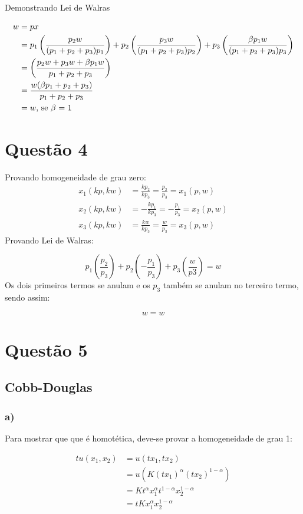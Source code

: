 \documentclass[
  letterpaper,
  DIV=11,
  numbers=noendperiod]{scrartcl}
\begin{document}
Demonstrando Lei de Walras

\begin{align}
w &= px \\
 &=  p_1 \left(\frac{p_2w}{(p_1+p_2+p_3)p_1}\right) + p_2\left(\frac{p_3w}{(p_1+p_2+p_3)p_2}\right) +
p_3 \left(\frac{\beta p_1w}{(p_1+p_2+p_3)p_3}\right) \\
&= \left(\frac{p_2w + p_3w + \beta p_1w}{p_1 + p_2 + p_3}\right) \\
&= \frac{w(\beta p_1 + p_2 +  p_3)}{p_1 + p_2 +  p_3} \\
&= w \textnormal{, se $\beta$ = 1}
\end{align}

\section{Questão 4}\label{questuxe3o-4}

Provando homogeneidade de grau zero: \begin{align}
x_1(kp, kw) &= \frac{kp_2}{kp_3} = \frac{p_2}{p_3} = x_1(p,w) \\
x_2(kp, kw) &=- \frac{kp_1}{kp_3} = - \frac{p_1}{p_3} = x_2(p,w) \\
x_3(kp, kw) &= \frac{kw}{kp_3} = \frac{w}{p_3} = x_3(p,w)
\end{align} Provando Lei de Walras:

\[
p_1 \left(\frac{p_2}{p_3}\right) + p_2 \left(-\frac{p_1}{p_3}\right) + p_3 \left(\frac{w}{p3}\right) = w 
\] Os dois primeiros termos se anulam e os \(p_3\) também se anulam no
terceiro termo, sendo assim:

\[
w = w
\]

\section{Questão 5}\label{questuxe3o-5}

\subsection{Cobb-Douglas}\label{cobb-douglas}

\subsubsection{a)}\label{a-2}

Para mostrar que que é homotética, deve-se provar a homogeneidade de
grau 1:

\begin{align}
tu(x_1, x_2) &= u(tx_1, tx_2) \\
&= u(K(tx_1)^\alpha (tx_2)^{1-\alpha}) \\
&= Kt^\alpha x_1^\alpha t^{1-\alpha}x_2^{1-\alpha} \\
&= tKx_1^\alpha x_2^{1-\alpha}
\end{align}
\end{document}
